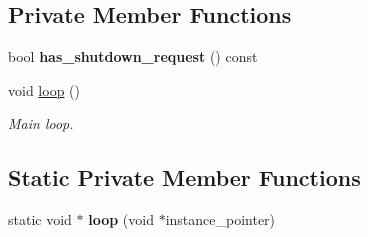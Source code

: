 \subsection*{Private Member Functions}
\begin{DoxyCompactItemize}
\item 
\mbox{\label{classrobot__interfaces_1_1RobotBackend_acfbf64755fc1910ca26f441085c99225}} 
bool {\bfseries has\+\_\+shutdown\+\_\+request} () const
\item 
void \hyperlink{classrobot__interfaces_1_1RobotBackend_a7cc66183743f277c41614a44fcc47b1a}{loop} ()
\begin{DoxyCompactList}\small\item\em Main loop. \end{DoxyCompactList}\end{DoxyCompactItemize}
\subsection*{Static Private Member Functions}
\begin{DoxyCompactItemize}
\item 
\mbox{\label{classrobot__interfaces_1_1RobotBackend_a44f21ab5414ea7742e34a3cf3dfe0650}} 
static void $\ast$ {\bfseries loop} (void $\ast$instance\+\_\+pointer)
\end{DoxyCompactItemize}
